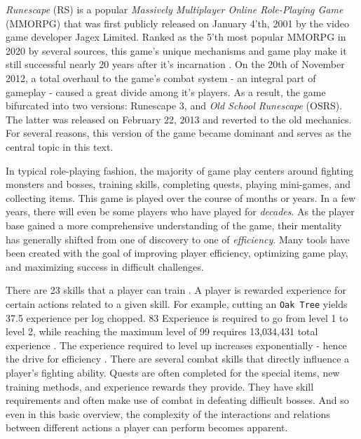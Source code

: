 \textit{Runescape} (RS) is a popular \textit{Massively Multiplayer Online Role-Playing Game} (MMORPG) that was first publicly released on January 4'th, 2001 by the video game developer Jagex Limited. Ranked as the 5'th most popular MMORPG in 2020 by several sources, this game's unique mechanisms and game play make it still successful nearly 20 years after it's incarnation \cite{bestreamer:10_most_played_mmorpgs_of_2020, altarofgaming:top_6_most_popular_mmorpgs, thegamer:ranking_the_15_best_mmorpgs}.
On the 20th of November 2012, a total overhaul to the game's combat system - an integral part of gameplay - caused a great divide among it's players. As a result, the game bifurcated into two versions: Runescape 3, and \textit{Old School Runescape} (OSRS). The latter was released on February 22, 2013 and reverted to the old mechanics. For several reasons, this version of the game became dominant and serves as the central topic in this text.

In typical role-playing fashion, the majority of game play centers around fighting monsters and bosses, training skills, completing quests, playing mini-games, and collecting items. This game is played over the course of months or years. In a few years, there will even be some players who have played for \emph{decades}. As the player base gained a more comprehensive understanding of the game, their mentality has generally shifted from one of discovery to one of \emph{efficiency}. Many tools have been created with the goal of improving player efficiency, optimizing game play, and maximizing success in difficult challenges. %

There are 23 skills that a player can train \cite{wiki:skills}. A player is rewarded experience for certain actions related to a given skill. For example, cutting an \texttt{Oak Tree} yields 37.5 experience per log chopped. 83 Experience is required to go from level 1 to level 2, while reaching the maximum level of 99 requires 13,034,431 total experience \cite{wiki:experience}. The experience required to level up increases exponentially - hence the drive for efficiency \cite{wiki:experience}. There are several combat skills that directly influence a player's fighting ability. Quests are often completed for the special items, new training methods, and experience rewards they provide. They have skill requirements and often make use of combat in defeating difficult bosses. And so even in this basic overview, the complexity of the interactions and relations between different actions a player can perform becomes apparent.

